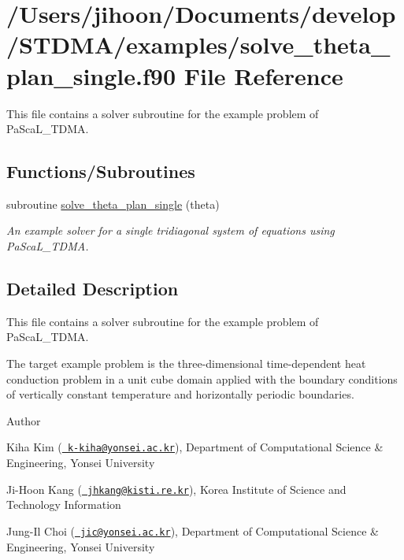 \hypertarget{solve__theta__plan__single_8f90}{}\section{/\+Users/jihoon/\+Documents/develop/\+S\+T\+D\+M\+A/examples/solve\+\_\+theta\+\_\+plan\+\_\+single.f90 File Reference}
\label{solve__theta__plan__single_8f90}


This file contains a solver subroutine for the example problem of Pa\+Sca\+L\+\_\+\+T\+D\+MA.  


\subsection*{Functions/\+Subroutines}
\begin{DoxyCompactItemize}
\item 
subroutine \mbox{\hyperlink{solve__theta__plan__single_8f90_a53ef6756822306f33a47be6a66232862}{solve\+\_\+theta\+\_\+plan\+\_\+single}} (theta)
\begin{DoxyCompactList}\small\item\em An example solver for a single tridiagonal system of equations using Pa\+Sca\+L\+\_\+\+T\+D\+MA. \end{DoxyCompactList}\end{DoxyCompactItemize}


\subsection{Detailed Description}
This file contains a solver subroutine for the example problem of Pa\+Sca\+L\+\_\+\+T\+D\+MA. 

The target example problem is the three-\/dimensional time-\/dependent heat conduction problem in a unit cube domain applied with the boundary conditions of vertically constant temperature and horizontally periodic boundaries. \begin{DoxyAuthor}{Author}

\end{DoxyAuthor}

\begin{DoxyItemize}
\item Kiha Kim (\href{mailto:k-kiha@yonsei.ac.kr}{\texttt{ k-\/kiha@yonsei.\+ac.\+kr}}), Department of Computational Science \& Engineering, Yonsei University
\item Ji-\/\+Hoon Kang (\href{mailto:jhkang@kisti.re.kr}{\texttt{ jhkang@kisti.\+re.\+kr}}), Korea Institute of Science and Technology Information
\item Jung-\/\+Il Choi (\href{mailto:jic@yonsei.ac.kr}{\texttt{ jic@yonsei.\+ac.\+kr}}), Department of Computational Science \& Engineering, Yonsei University
\end{DoxyItemize}

